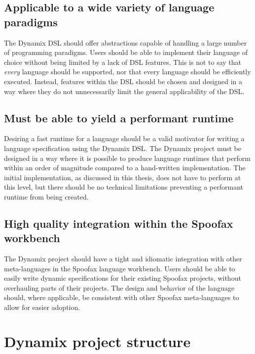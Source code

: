 \subsection*{Applicable to a wide variety of language paradigms}
The Dynamix \ac{DSL} should offer abstractions capable of handling a large number of programming paradigms. Users should be able to implement their language of choice without being limited by a lack of \ac{DSL} features. This is not to say that \textit{every} language should be supported, nor that every language should be efficiently executed. Instead, features within the \ac{DSL} should be chosen and designed in a way where they do not unnecessarily limit the general applicability of the \ac{DSL}.

\subsection*{Must be able to yield a performant runtime}
Desiring a fast runtime for a language should be a valid motivator for writing a language specification using the Dynamix \ac{DSL}. The Dynamix project must be designed in a way where it is possible to produce language runtimes that perform within an order of magnitude compared to a hand-written implementation. The initial implementation, as discussed in this thesis, does not have to perform at this level, but there should be no technical limitations preventing a performant runtime from being created.

\subsection*{High quality integration within the Spoofax workbench}
The Dynamix project should have a tight and idiomatic integration with other meta-languages in the Spoofax language workbench. Users should be able to easily write dynamic specifications for their existing Spoofax projects, without overhauling parts of their projects. The design and behavior of the language should, where applicable, be consistent with other Spoofax meta-languages to allow for easier adoption.

\section{Dynamix project structure}
